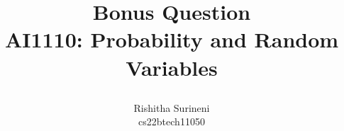 \documentclass[journal,12pt,twocolumn]{IEEEtran}
\begin{document}
\let\vec\mathbf

\vspace{3cm}

\title{
\textbf{Bonus Question} \\ \large \textbf{AI1110}: Probability and Random Variables 


}
\author{ Rishitha Surineni\\ cs22btech11050} 
	



\maketitle

\newpage


\bigskip

\renewcommand{\thefigure}{\theenumi}
\renewcommand{\thetable}{\theenumi}
\end{document}
